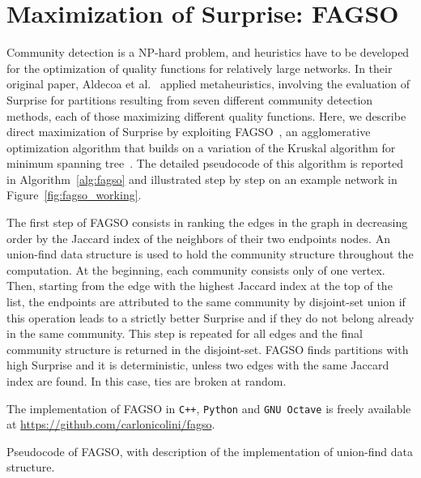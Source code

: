 

\section{Maximization of Surprise: FAGSO}\label{sec:max_surprise_fagso}

Community detection is a NP-hard problem, and heuristics have to be developed for the optimization of quality functions for relatively large networks. In their original paper, Aldecoa et al.~\cite{aldecoa2011} applied metaheuristics, involving the evaluation of Surprise for partitions resulting from seven different community detection methods, each of those maximizing different quality functions.
Here, we describe direct maximization of Surprise by exploiting FAGSO~\cite{jiang2014}, an agglomerative optimization algorithm that builds on a variation of the Kruskal algorithm for minimum spanning tree~\cite{leiserson2001}.
The detailed pseudocode of this algorithm is reported in Algorithm~\ref{alg:fagso} and illustrated step by step on an example network in Figure~\ref{fig:fagso_working}.

The first step of FAGSO consists in ranking the edges in the graph in decreasing order by the Jaccard index of the neighbors of their two endpoints nodes.
An union-find data structure is used to hold the community structure throughout the computation.
At the beginning, each community consists only of one vertex.
Then, starting from the edge with the highest Jaccard index at the top of the list, the endpoints are attributed to the same community by disjoint-set union if this operation leads to a strictly better Surprise and if they do not belong already in the same community.
This step is repeated for all edges and the final community structure is returned in the disjoint-set.
FAGSO finds partitions with high Surprise and it is deterministic, unless two edges with the same Jaccard index are found. In this case, ties are broken at random. 

The implementation of FAGSO in \texttt{C++}, \texttt{Python} and \texttt{GNU Octave} is freely available at \url{https://github.com/carlonicolini/fagso}.

\begin{Algorithm}[htb!]

\caption{Pseudocode of FAGSO, with description of the implementation of union-find data structure.}
\label{alg:fagso}
\end{Algorithm}

